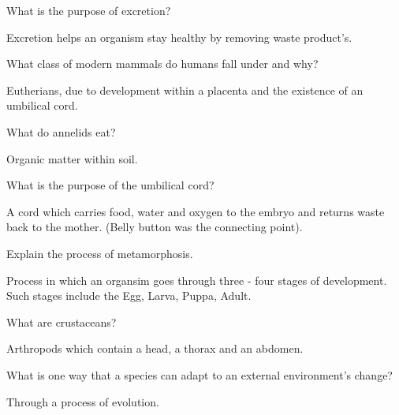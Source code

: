\documentclass[12pt]{article} %
\begin{document}
  \begin{qstn}
    What is the purpose of excretion?
  \end{qstn}
  \begin{soln}
    Excretion helps an organism stay healthy by removing waste product's.
  \end{soln}

  \begin{qstn}
    What class of modern mammals do humans fall under and why?
  \end{qstn}
  \begin{soln}
    Eutherians, due to development within a placenta and the existence of an umbilical cord.
  \end{soln}

  \begin{qstn}
    What do annelids eat?
  \end{qstn}
  \begin{soln}
    Organic matter within soil.
  \end{soln}

  \begin{qstn}
    What is the purpose of the umbilical cord?
  \end{qstn}
  \begin{soln}
    A cord which carries food, water and oxygen to the embryo and returns waste back to the mother. (Belly button was the
        connecting point).
  \end{soln}


  \begin{qstn}
    Explain the process of metamorphosis. 
  \end{qstn}
  \begin{soln}
    Process in which an organsim goes through three - four stages of development. Such stages include the Egg, Larva, Puppa, Adult.
  \end{soln}

  \begin{qstn}
    What are crustaceans?
  \end{qstn}
  \begin{soln}
  Arthropods which contain a head, a thorax and an abdomen.\newline
  \end{soln}

  \begin{qstn}
    What is one way that a species can adapt to an external environment's change?
  \end{qstn}
  \begin{soln}
    Through a process of evolution.
  \end{soln}
\end{document}
